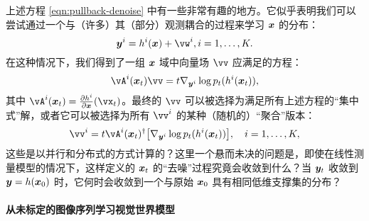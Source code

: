 \documentclass[../../book-main.tex]{subfiles}
\begin{document}
\begin{remark}[并行感知与分布式去噪]
{上述方程 \eqref{eqn:pullback-denoise} 中有一些非常有趣的地方。它似乎表明我们可以尝试通过一个与（许多）其（部分）观测耦合的过程来学习 $\bm{x}$ 的分布：
\begin{equation}
\y^i = h^i(\x) +\vw^i, i =1, \ldots, K.
\end{equation} 在这种情况下，我们得到了一组 $\bm{x}$ 域中向量场 $\vv$ 应满足的方程：
\begin{equation}
    \vA^i(\x_t) \vv = t \nabla_{\y^i} \log p_t(h^i(\x_t)),
\label{eqn:federated-pushforward}
\end{equation}
其中 $\vA^i(\x_t) = \frac{\partial h^i}{\partial \x}(\vx_t)$。最终的 $\vv$ 可以被选择为满足所有上述方程的“集中式”解，或者它可以被选择为所有 $\vv^i$ 的某种（随机的）“聚合”版本：
\begin{equation}
    \vv^i = t\vA^i(\x_t)^\dagger \big[\nabla_{\y^i} \log p_t(h^i(\x_t))\big], \quad i = 1, \ldots, K,
\end{equation}
这些是以并行和分布式的方式计算的？这里一个悬而未决的问题是，即使在线性测量模型的情况下，这样定义的 $\bm{x}_t$ 的“去噪”过程究竟会收敛到什么？当 $\bm{y}_t$ 收敛到 $\bm{y} = h(\bm{x}_0)$ 时，它何时会收敛到一个与原始 $\bm{x}_0$ 具有相同低维支撑集的分布？ }
\end{remark}



\paragraph{从未标定的图像序列学习视觉世界模型}
\end{document}
